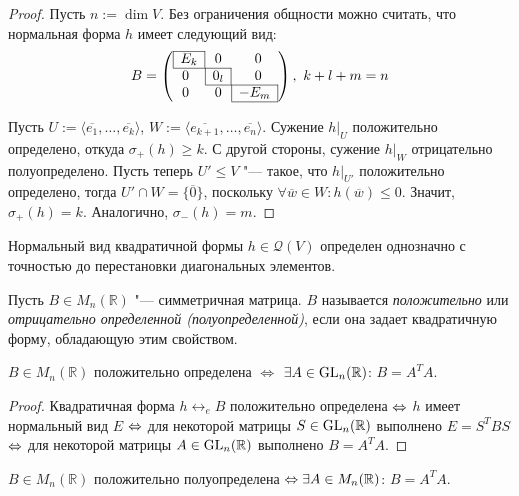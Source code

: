 \begin{proof}
	Пусть $n := \dim{V}$. Без ограничения общности можно считать, что нормальная форма $h$ имеет следующий вид:
	\[B = \left(\begin{array}{@{}ccc@{}}
		\cline{1-1}
		\multicolumn{1}{|c|}{E_k} & 0 & 0\\
		\cline{1-2}
		0 & \multicolumn{1}{|c|}{0_l} & 0\\
		\cline{2-3}
		0 & 0 & \multicolumn{1}{|c|}{-E_m}\\
		\cline{3-3}
	\end{array}\right),~k + l + m = n\]
	
	Пусть $U := \langle\overline{e_1}, \dots, \overline{e_k}\rangle$, $W := \langle\overline{e_{k + 1}}, \dots, \overline{e_n}\rangle$. Сужение $h|_U$ положительно определено, откуда $\sigma_+(h) \ge k$. С другой стороны, сужение $h|_W$ отрицательно полуопределено. Пусть теперь $U' \le V$ "--- такое, что $h|_{U'}$ положительно определено, тогда $U' \cap W = \{\overline{0}\}$, поскольку $\forall \overline{w} \in W: h(\overline{w}) \le 0$. Значит, $\sigma_+(h) = k$. Аналогично, $\sigma_-(h) = m$.
\end{proof}

\begin{corollary}
	Нормальный вид квадратичной формы $h \in \mathcal{Q}(V)$ определен однозначно с точностью до перестановки диагональных элементов.
\end{corollary}

\begin{definition}
	Пусть $B \in M_n(\mathbb{R})$ "--- симметричная матрица. $B$ называется \textit{положительно} или \textit{отрицательно определенной (полуопределенной)}, если она задает квадратичную форму, обладающую этим свойством.
\end{definition}

\begin{proposition}
	$B \in M_n(\mathbb{R})$ положительно определена $\Leftrightarrow$ $\exists A \hm{\in} \GL_n(\mathbb{R})$: $B = A^TA$.
\end{proposition}

\begin{proof}
	Квадратичная форма $h \leftrightarrow_e B$ положительно определена $\Leftrightarrow$ $h$ имеет нормальный вид $E$ $\Leftrightarrow$ для некоторой матрицы $S \in \operatorname{GL}_n(\mathbb{R})$ выполнено $E = S^TBS$ $\Leftrightarrow$ для некоторой матрицы $A \hm{\in} \GL_n(\mathbb{R})$ выполнено $B = A^TA$.
\end{proof}

\begin{proposition}
	$B \in M_n(\mathbb{R})$ положительно полуопределена $\hm{\Leftrightarrow} \exists A \hm{\in} M_n(\mathbb{R})$: $B = A^TA$.
\end{proposition}

